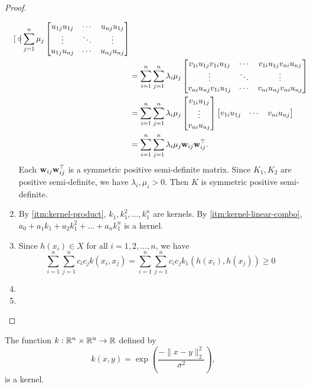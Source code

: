 \begin{proof}
\begin{enumerate}
\begin{align*}
\begin{bmatrix}
            \end{bmatrix} \circ
            \sum_{j=1}^{n} \mu_{j}
            \begin{bmatrix}
                u_{1j} u_{1j} & \cdots & u_{nj} u_{1j} \\
                \vdots & \ddots & \vdots\\
                u_{1j} u_{nj} & \cdots & u_{nj} u_{nj}\\
            \end{bmatrix}\\
            &= \sum_{i=1}^{n} \sum_{j=1}^{n} \lambda_{i} \mu_{j}
            \begin{bmatrix}
                v_{1i} u_{1j} v_{1i} u_{1j} & \cdots & v_{1i} u_{1j} v_{ni} u_{nj} \\
                \vdots & \ddots & \vdots\\
                v_{ni} u_{nj} v_{1i} u_{1j} & \cdots & v_{ni} u_{nj} v_{ni}  u_{nj}
            \end{bmatrix}\\
            &= \sum_{i=1}^{n} \sum_{j=1}^{n} \lambda_{i} \mu_{j}
            \begin{bmatrix}
                v_{1i} u_{1j} \\ \vdots \\ v_{ni} u_{nj}
            \end{bmatrix}
            \begin{bmatrix}
                v_{1i} u_{1j} & \cdots & v_{ni} u_{nj}
            \end{bmatrix}\\
            &= \sum_{i=1}^{n} \sum_{j=1}^{n} \lambda_{i} \mu_{j}
            \mathbf{w}_{ij} \mathbf{w}_{ij}^\top.
        \end{align*}
        Each \(\mathbf{w}_{ij} \mathbf{w}_{ij}^\top\) is a symmetric positive semi-definite matrix.
        Since \(K_1, K_2\) are positive semi-definite, we have \(\lambda_i, \mu_i > 0\).
        Then \(K\) is symmetric positive semi-definite.
        \item By \ref{itm:kernel-product}, \(k_1, k_1^2, \dots, k_1^n\) are kernels.
        By \ref{itm:kernel-linear-combo}, \(a_0 + a_1 k_1 + a_2 k_1^2 + \dots + a_n k_1^n\) is a kernel.
        \item Since \(h(x_i) \in X\) for all \(i = 1,2,\dots, n\), we have
        \[
            \sum_{i=1}^{n} \sum_{j=1}^{n} c_i c_j k(x_i,x_j)
            = \sum_{i=1}^{n} \sum_{j=1}^{n} c_i c_j k_1(h(x_i), h(x_j))
            \geq 0
        \]
        \item 
        \item 
    \end{enumerate}
\end{proof}

\begin{theorem}
    The function \(k : \mathbb{R}^n \times \mathbb{R}^n \to \mathbb{R}\) defined by
    \[k(x,y) = \exp\left(\dfrac{-\|x-y\|^2_2}{\sigma^2}\right),\]
    is a kernel.
\end{theorem}